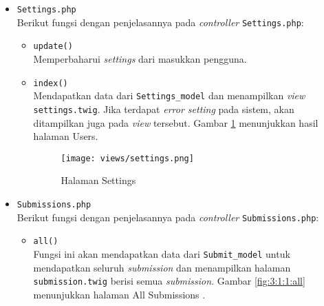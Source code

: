 \begin{itemize}
	\item \verb|Settings.php| \\
	      Berikut fungsi dengan penjelasannya pada \textit{controller} \verb|Settings.php|:

	      \begin{itemize}
		      \item \verb|update()| \\
		            Memperbaharui \textit{settings} dari masukkan pengguna.
		      \item \verb|index()| \\
		            Mendapatkan data dari \verb|Settings_model| dan menampilkan \textit{view} \verb|settings.twig|. Jika terdapat \textit{error setting} pada sistem, akan ditampilkan juga pada \textit{view} tersebut. Gambar \ref{fig:3:1:1:settings} menunjukkan hasil halaman Users.

		            \begin{figure}[H]
			            \centering
			            \texttt{[image: views/settings.png]}
			            \caption{Halaman Settings}
			            \label{fig:3:1:1:settings}
		            \end{figure}

	      \end{itemize}

	\item \verb|Submissions.php| \\
	      Berikut fungsi dengan penjelasannya pada \textit{controller} \verb|Submissions.php|:

	      \begin{itemize}
		      \item \verb|all()| \\
		            Fungsi ini akan mendapatkan data dari \verb|Submit_model| untuk mendapatkan seluruh \textit{submission} dan menampilkan halaman \verb|submission.twig| berisi semua \textit{submission}. Gambar \ref{fig:3:1:1:all} menunjukkan halaman All Submissions .


\end{itemize}
\end{itemize}
